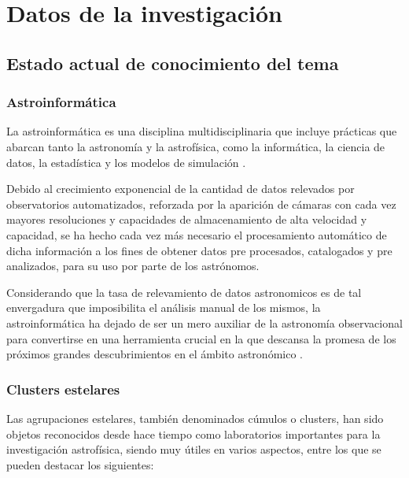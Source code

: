 \documentclass[
	11pt,oneside,a4paper,
	fleqn,
	article
]{memoir}
\begin{document}




\section{Datos de la investigación}

\subsection{Estado actual de conocimiento del tema}

\subsubsection{Astroinformática}

La astroinformática es una disciplina multidisciplinaria que incluye prácticas que abarcan tanto la astronomía y la astrofísica, como la informática, la ciencia de datos, la estadística y los modelos de simulación \parencite{borne2009astroinformatics}.

Debido al crecimiento exponencial de la cantidad de datos relevados por observatorios automatizados, reforzada por la aparición de cámaras con cada vez mayores resoluciones y capacidades de almacenamiento de alta velocidad y capacidad, se ha hecho cada vez más necesario el procesamiento automático de dicha información a los fines de obtener datos pre procesados, catalogados y pre analizados, para su uso por parte de los astrónomos.

Considerando que la tasa de relevamiento de datos astronomicos es de tal envergadura que imposibilita el análisis manual de los mismos, la astroinformática ha dejado de ser un mero auxiliar de la astronomía observacional para convertirse en una herramienta crucial en la que descansa la promesa de los próximos grandes descubrimientos en el ámbito astronómico \parencite{mahabal2024astroinformatics}.

\subsubsection{Clusters estelares}

Las agrupaciones estelares, también denominados cúmulos o clusters, han sido objetos reconocidos desde hace tiempo como laboratorios importantes para la investigación astrofísica, siendo muy útiles en varios aspectos, entre los que se pueden destacar los siguientes:
\end{document}
